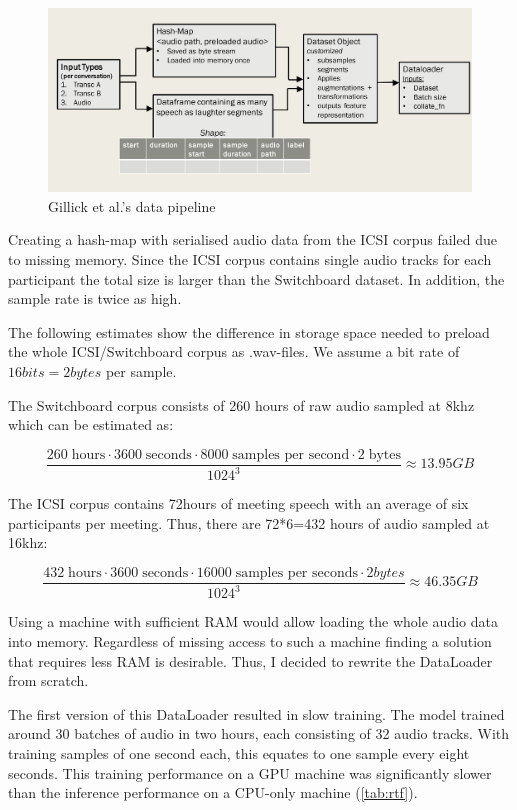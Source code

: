 \documentclass[bsc,frontabs,parskip,deptreport]{infthesis}
\begin{document}
\begin{figure}
    \centering
    \includegraphics[width=14cm]{imgs/diagrams/Gillick_et_al_data_pipeline.png}
    \caption{Gillick et al.'s data pipeline}
    \label{fig:gillick-data-pipeline}
\end{figure}

Creating a hash-map with serialised audio data from the ICSI corpus failed due to missing memory. Since the ICSI corpus contains single audio tracks for each participant the total size is larger than the Switchboard dataset. In addition, the sample rate is twice as high. 

The following estimates show the difference in storage space needed to preload the whole ICSI/Switchboard corpus as .wav-files. We assume a bit rate of $16bits=2bytes$ per sample.

The Switchboard corpus consists of 260 hours of raw audio sampled at 8khz which can be estimated as:

\[ \frac{260\;\textrm{hours} \cdot 3600\;\textrm{seconds} \cdot 8000\;\textrm{samples per second} \cdot 2\;\textrm{bytes}}{1024^3} \approx 13.95 GB \]

The ICSI corpus contains 72hours of meeting speech with an average of six participants per meeting. Thus, there are 72*6=432 hours of audio sampled at 16khz:

\[ \frac{432\;\textrm{hours} \cdot 3600\;\textrm{seconds} \cdot 16000 \;\textrm{samples per seconds} \cdot 2bytes}{1024^3} \approx 46.35 GB \]

Using a machine with sufficient RAM would allow loading the whole audio data into memory. 
Regardless of missing access to such a machine finding a solution that requires less RAM is desirable. Thus, I decided to rewrite the DataLoader from scratch. 

The first version of this DataLoader resulted in slow training. The model trained around 30 batches of audio in two hours, each consisting of 32 audio tracks. 
With training samples of one second each, this equates to one sample every eight seconds.
This training performance on a GPU machine was significantly slower than the inference performance on a CPU-only machine (\autoref{tab:rtf}).
\end{document}
